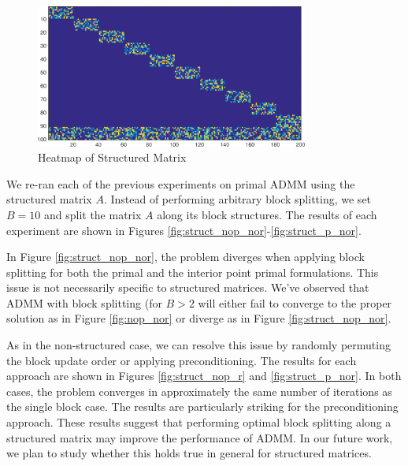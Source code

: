 \documentclass{article}
\begin{document}
{\begin{figure}[h]
	\centering
	\includegraphics[width=0.8\textwidth]{../figures/struct_prob.png}
	\caption{Heatmap of Structured Matrix}
	\label{fig:struct_prob}
\end{figure}

We re-ran each of the previous experiments on primal ADMM using the structured matrix $A$. Instead of performing arbitrary block splitting, we set $B=10$ and split the matrix $A$ along its block structures. The results of each experiment are shown in Figures \ref{fig:struct_nop_nor}-\ref{fig:struct_p_nor}.

In Figure \ref{fig:struct_nop_nor}, the problem diverges when applying block splitting for both the primal and the interior point primal formulations. This issue is not necessarily specific to structured matrices. We've observed that ADMM with block splitting (for $B>2$ will either fail to converge to the proper solution as in Figure \ref{fig:nop_nor} or diverge as in Figure \ref{fig:struct_nop_nor}. 


As in the non-structured case, we can resolve this issue by randomly permuting the block update order or applying preconditioning. The results for each approach are shown in Figures \ref{fig:struct_nop_r} and \ref{fig:struct_p_nor}. In both cases, the problem converges in approximately the same number of iterations as the single block case. The results are particularly striking for the preconditioning approach. These results suggest that performing optimal block splitting along a structured matrix may improve the performance of ADMM. In our future work, we plan to study whether this holds true in general for structured matrices.

}
\end{document}
